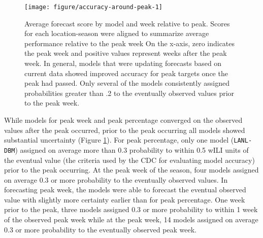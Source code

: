 \documentclass[9pt,twocolumn,twoside]{pnas-new}\usepackage[]{graphicx}\usepackage[]{color}
\newenvironment{knitrout}{}{} %
\begin{document}
\begin{knitrout}
\color{fgcolor}\begin{figure}
\texttt{[image: figure/accuracy-around-peak-1]} \caption[Average forecast score by model and week relative to peak]{Average forecast score by model and week relative to peak. Scores for each location-season were aligned to summarize average performance relative to the peak week On the x-axis, zero indicates the peak week and positive values represent weeks after the peak week. In general, models that were updating forecasts based on current data showed improved accuracy for peak targets once the peak had passed. Only several of the models consistently assigned probabilities greater than .2 to the eventually observed values prior to the peak week.}\label{fig:accuracy-around-peak}
\end{figure}


\end{knitrout}

While models for peak week and peak percentage converged on the observed values after the peak occurred, prior to the peak occurring all models showed substantial uncertainty (Figure \ref{fig:accuracy-around-peak}). 
For peak percentage, only one model ({\tt LANL-DBM}) assigned on average more than 0.3 probability to within 0.5 wILI units of the eventual value (the criteria used by the CDC for evaluating model accuracy) prior to the peak occurring. At the peak week of the season, four models assigned on average 0.3 or more probability to the eventually observed values. In forecasting peak week, the models were able to forecast the eventual observed value with slightly more certainty earlier than for peak percentage. One week prior to the peak, three models assigned 0.3 or more probability to within 1 week of the observed peak week while at the peak week, 14 models assigned on average 0.3 or more probability to the eventually observed peak week.


% 
% 
% 
\end{document}
